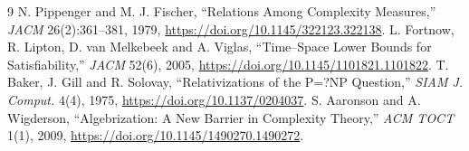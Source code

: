 \documentclass[11pt]{article}
\begin{document}
\begin{thebibliography}{9}
 N. Pippenger and M. J. Fischer,
``Relations Among Complexity Measures,'' \emph{JACM} 26(2):361--381, 1979,
\url{https://doi.org/10.1145/322123.322138}.
 L. Fortnow, R. Lipton, D. van Melkebeek and A. Viglas,
``Time--Space Lower Bounds for Satisfiability,'' \emph{JACM} 52(6), 2005,
\url{https://doi.org/10.1145/1101821.1101822}.
 T. Baker, J. Gill and R. Solovay,
``Relativizations of the P=?NP Question,'' \emph{SIAM J. Comput.} 4(4), 1975,
\url{https://doi.org/10.1137/0204037}.
 S. Aaronson and A. Wigderson,
``Algebrization: A New Barrier in Complexity Theory,'' \emph{ACM TOCT} 1(1),
2009, \url{https://doi.org/10.1145/1490270.1490272}.
\end{thebibliography}
\end{document}

